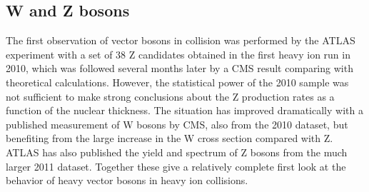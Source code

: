 \subsection{W and Z bosons}

The first observation of vector bosons in \PbPb collision was performed by the ATLAS
experiment with a set of 38 Z candidates obtained in the first heavy ion run in 2010, which
was followed several months later by a CMS result comparing with theoretical calculations.
However, the statistical power of the 2010 sample was not sufficient to make strong conclusions
about the Z production rates as a function of the nuclear thickness.
The situation has improved dramatically with a published measurement of W bosons by CMS, also from the
2010 dataset, but benefiting from the large increase in the W cross section compared with Z.
ATLAS has also published the yield and spectrum of Z bosons from the much larger 2011 \PbPb dataset.
Together these give a relatively complete first look at the behavior of heavy vector bosons in
heavy ion collisions.



